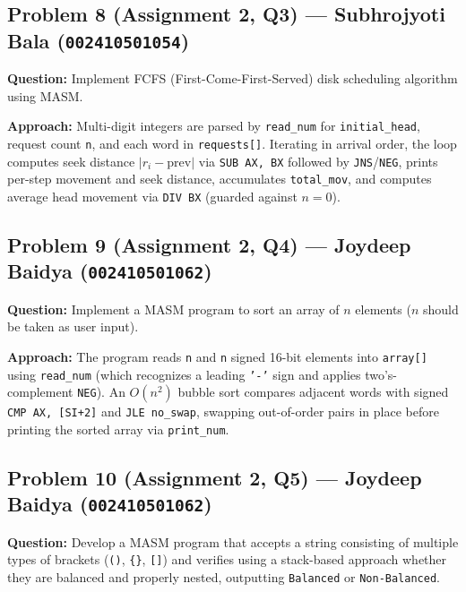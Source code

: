 \documentclass[11pt,a4paper]{article}
\begin{document}
\subsection{Problem 8 (Assignment 2, Q3) --- Subhrojyoti Bala (\texttt{002410501054})}

\textbf{Question:} Implement FCFS (First-Come-First-Served) disk scheduling algorithm using MASM.

\textbf{Approach:} Multi-digit integers are parsed by \texttt{read\_num} for \texttt{initial\_head}, request count \texttt{n}, and each word in \texttt{requests[]}. Iterating in arrival order, the loop computes seek distance $|r_i - \text{prev}|$ via \texttt{SUB AX, BX} followed by \texttt{JNS}/\texttt{NEG}, prints per-step movement and seek distance, accumulates \texttt{total\_mov}, and computes average head movement via \texttt{DIV BX} (guarded against $n=0$).



\subsection{Problem 9 (Assignment 2, Q4) --- Joydeep Baidya (\texttt{002410501062})}

\textbf{Question:} Implement a MASM program to sort an array of $n$ elements ($n$ should be taken as user input).

\textbf{Approach:} The program reads \texttt{n} and \texttt{n} signed 16-bit elements into \texttt{array[]} using \texttt{read\_num} (which recognizes a leading \texttt{'-'} sign and applies two's-complement \texttt{NEG}). An $O(n^2)$ bubble sort compares adjacent words with signed \texttt{CMP AX, [SI+2]} and \texttt{JLE no\_swap}, swapping out-of-order pairs in place before printing the sorted array via \texttt{print\_num}.



\subsection{Problem 10 (Assignment 2, Q5) --- Joydeep Baidya (\texttt{002410501062})}

\textbf{Question:} Develop a MASM program that accepts a string consisting of multiple types of brackets (\texttt{()}, \texttt{\{\}}, \texttt{[]}) and verifies using a stack-based approach whether they are balanced and properly nested, outputting \texttt{Balanced} or \texttt{Non-Balanced}.
\end{document}
